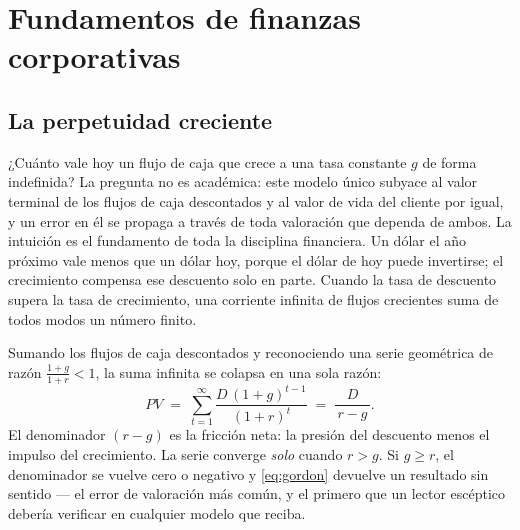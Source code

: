 \chapter{Fundamentos de finanzas corporativas}\label{ch:corporate-finance-core}


\section{La perpetuidad creciente}\label{sec:growing-perpetuity}

¿Cuánto vale hoy un flujo de caja que crece a una tasa constante \(g\) de forma indefinida? La
pregunta no es académica: este modelo único subyace al valor terminal de los flujos de caja
descontados y al valor de vida del cliente por igual, y un error en él se propaga a través de
toda valoración que dependa de ambos. La intuición es el fundamento de toda la disciplina
financiera. Un dólar el año próximo vale menos que un dólar hoy, porque el dólar de hoy puede
invertirse; el crecimiento compensa ese descuento solo en parte. Cuando la tasa de descuento
supera la tasa de crecimiento, una corriente infinita de flujos crecientes suma de todos modos
un número finito.

Sumando los flujos de caja descontados y reconociendo una serie geométrica de razón
\(\frac{1+g}{1+r}<1\), la suma infinita se colapsa en una sola razón:
\begin{equation}\label{eq:gordon}
  PV \;=\; \sum_{t=1}^{\infty}\frac{D\,(1+g)^{t-1}}{(1+r)^{t}}
      \;=\; \frac{D}{\,r-g\,}.
\end{equation}
El denominador \((r-g)\) es la fricción neta: la presión del descuento menos el impulso del
crecimiento. La serie converge \emph{solo} cuando \(r>g\). Si \(g\ge r\), el denominador
se vuelve cero o negativo y \cref{eq:gordon} devuelve un resultado sin sentido --- el error
de valoración más común, y el primero que un lector escéptico debería verificar en cualquier
modelo que reciba.

